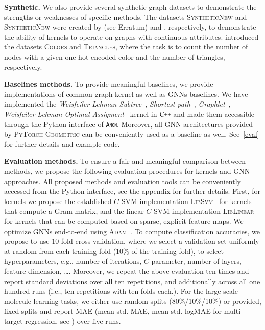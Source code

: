 \documentclass{article}
\newcommand{\xhdr}[1]{{\noindent\bfseries #1}}
\theoremstyle{definition}
\newcommand{\new}[1]{\emph{#1}}
\newcommand{\CPP}[1][]{$\text{C\hspace{-.25ex}}^{_{_{_{++}}}}
	\ifthenelse{\equal{#1}{}}{}{\text{\hspace{-.625ex}#1}}$}
\begin{document}
\xhdr{Synthetic.}
We also provide several synthetic graph datasets to demonstrate the strengths or weaknesses of specific methods. The datasets \textsc{SyntheticNew} and \textsc{SyntheticNew} were created by \citet{Fer+2013} (see Erratum) and \citet{Mor+2016}, respectively, to demonstrate the ability of kernels to operate on graphs with continuous attributes. \citet{Knyazev2019} introduced the datasets \textsc{Colors} and \textsc{Triangles}, where the task is to count the number of nodes with a given one-hot-encoded color and the number of triangles, respectively. 

\xhdr{Baselines methods.} To provide meaningful baselines, we provide implementations of common graph kernel as well as GNNs baselines. We have implemented the \new{Weisfeiler-Lehman Subtree}~\cite{She+2011}, \new{Shortest-path}~\cite{Bor+2005}, \new{Graphlet}~\cite{She+2009}, \new{Weisfeiler-Lehman Optimal Assigment}~\cite{Kri+2016} kernel in \CPP and made them accessible through the Python interface of \textsc{\texttt{Anon}}.  Moreover, all GNN architectures provided by \textsc{PyTorch Geometric} can be conveniently used as a baseline as well. See~\cref{eval} for further details and example code.

\xhdr{Evaluation methods.}\label{eval} To ensure a fair and meaningful comparison between methods, we propose the following evaluation procedures for kernels and GNN approaches. All proposed methods and evaluation tools can be conveniently accessed from the Python interface, see the appendix for further details. First, for kernels we propose the established $C$-SVM implementation \textsc{LibSvm}~\cite{Cha+11} for kernels that compute a Gram matrix, and the linear $C$-SVM implementation \textsc{LibLinear}~\cite{Fan+2008} for kernels  that can be computed based on sparse, explicit feature maps. We optimize GNNs end-to-end using \textsc{Adam}~\cite{Kin+2015}. To compute classification accuracies, we propose to use $10$-fold cross-validation, where we select a validation set uniformly at random from each training fold ($10\%$ of the training fold), to select hyperparameters, e.g., number of iterations, $C$ parameter, number of layers, feature dimension, \dots. Moreover, we repeat the above evaluation ten times and report standard deviations over all ten repetitions, and additionally across all one hundred runs (i.e., ten repetitions with ten folds each.). For the large-scale molecule learning tasks, we either use random splits (80\%/10\%/10\%) or provided, fixed splits and report MAE (mean std. MAE, mean std. logMAE for multi-target regression, see \cite{Kli+2020}) over five runs. 
\end{document}
